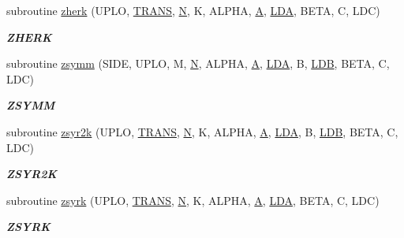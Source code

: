 \begin{DoxyCompactItemize}
subroutine \hyperlink{group__complex16__blas__level3_ga71e68893445a523b923411ebf4c22582}{zherk} (U\+P\+L\+O, \hyperlink{superlu__enum__consts_8h_a0c4e17b2d5cea33f9991ccc6a6678d62a1f61e3015bfe0f0c2c3fda4c5a0cdf58}{T\+R\+A\+N\+S}, \hyperlink{polmisc_8c_a0240ac851181b84ac374872dc5434ee4}{N}, K, A\+L\+P\+H\+A, \hyperlink{classA}{A}, \hyperlink{example__user_8c_ae946da542ce0db94dced19b2ecefd1aa}{L\+D\+A}, B\+E\+T\+A, C, L\+D\+C)
\begin{DoxyCompactList}\small\item\em {\bfseries Z\+H\+E\+R\+K} \end{DoxyCompactList}\item 
subroutine \hyperlink{group__complex16__blas__level3_ga263a46a500f5c7f04bee1b75ea7f64f6}{zsymm} (S\+I\+D\+E, U\+P\+L\+O, M, \hyperlink{polmisc_8c_a0240ac851181b84ac374872dc5434ee4}{N}, A\+L\+P\+H\+A, \hyperlink{classA}{A}, \hyperlink{example__user_8c_ae946da542ce0db94dced19b2ecefd1aa}{L\+D\+A}, B, \hyperlink{example__user_8c_a50e90a7104df172b5a89a06c47fcca04}{L\+D\+B}, B\+E\+T\+A, C, L\+D\+C)
\begin{DoxyCompactList}\small\item\em {\bfseries Z\+S\+Y\+M\+M} \end{DoxyCompactList}\item 
subroutine \hyperlink{group__complex16__blas__level3_gabe5914922259539af5fa20f324a58add}{zsyr2k} (U\+P\+L\+O, \hyperlink{superlu__enum__consts_8h_a0c4e17b2d5cea33f9991ccc6a6678d62a1f61e3015bfe0f0c2c3fda4c5a0cdf58}{T\+R\+A\+N\+S}, \hyperlink{polmisc_8c_a0240ac851181b84ac374872dc5434ee4}{N}, K, A\+L\+P\+H\+A, \hyperlink{classA}{A}, \hyperlink{example__user_8c_ae946da542ce0db94dced19b2ecefd1aa}{L\+D\+A}, B, \hyperlink{example__user_8c_a50e90a7104df172b5a89a06c47fcca04}{L\+D\+B}, B\+E\+T\+A, C, L\+D\+C)
\begin{DoxyCompactList}\small\item\em {\bfseries Z\+S\+Y\+R2\+K} \end{DoxyCompactList}\item 
subroutine \hyperlink{group__complex16__blas__level3_ga3faec48d92afecad0a791157278b184c}{zsyrk} (U\+P\+L\+O, \hyperlink{superlu__enum__consts_8h_a0c4e17b2d5cea33f9991ccc6a6678d62a1f61e3015bfe0f0c2c3fda4c5a0cdf58}{T\+R\+A\+N\+S}, \hyperlink{polmisc_8c_a0240ac851181b84ac374872dc5434ee4}{N}, K, A\+L\+P\+H\+A, \hyperlink{classA}{A}, \hyperlink{example__user_8c_ae946da542ce0db94dced19b2ecefd1aa}{L\+D\+A}, B\+E\+T\+A, C, L\+D\+C)
\begin{DoxyCompactList}\small\item\em {\bfseries Z\+S\+Y\+R\+K} \end{DoxyCompactList}\item 

\end{DoxyCompactItemize}
